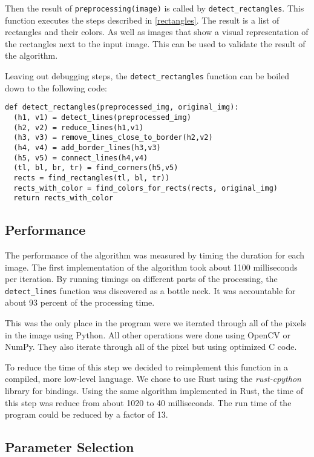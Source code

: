 Then the result of \texttt{preprocessing(image)} is called by
\texttt{detect\_rectangles}. This function executes the steps described in
\ref{rectangles}. The result is a list of rectangles and their colors. As
well as images that show a visual representation of the rectangles next to
the input image. This can be used to validate the result of the algorithm.

Leaving out debugging steps, the \texttt{detect\_rectangles} function can be
boiled down to the following code:

\begin{lstlisting}
def detect_rectangles(preprocessed_img, original_img):
  (h1, v1) = detect_lines(preprocessed_img)
  (h2, v2) = reduce_lines(h1,v1)
  (h3, v3) = remove_lines_close_to_border(h2,v2)
  (h4, v4) = add_border_lines(h3,v3)
  (h5, v5) = connect_lines(h4,v4)
  (tl, bl, br, tr) = find_corners(h5,v5)
  rects = find_rectangles(tl, bl, tr))
  rects_with_color = find_colors_for_rects(rects, original_img)
  return rects_with_color
\end{lstlisting}

\subsection{Performance} \label{performance}

The performance of the algorithm was measured by timing the duration for each
image. The first implementation of the algorithm took about 1100 milliseconds per
iteration. By running timings on different parts of the processing, the
\texttt{detect\_lines} function was discovered as a bottle neck. It was
accountable for about 93 percent of the processing time.

This was the only place in the program were we iterated through all of the pixels
in the image using Python. All other operations were done using OpenCV or NumPy.
They also iterate through all of the pixel but using optimized C code.

To reduce the time of this step we decided to reimplement this function in a
compiled, more low-level language. We chose to use Rust using the \textit{rust-cpython}
library for bindings. Using the same algorithm implemented in Rust, the time of
this step was reduce from about 1020 to 40 milliseconds. The run time of the
program could be reduced by a factor of 13.

\subsection{Parameter Selection} \label{parameter}

